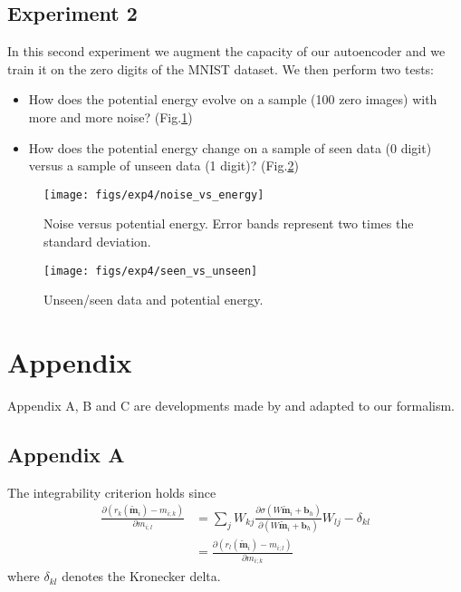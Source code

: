 \documentclass[12pt]{report}
\begin{document}
\clearpage
\subsection{Experiment 2}
In this second experiment we augment the capacity of our autoencoder and we train it on the zero digits of the MNIST dataset. We then perform two tests:
\begin{itemize}
\item How does the potential energy evolve on a sample (100 zero images) with more and more noise? (Fig.\ref{fig:noise-energy})
\item How does the potential energy change on a sample of seen data (0 digit) versus a sample of unseen data (1 digit)? (Fig.\ref{fig:seen-unseen})
\end{itemize}

\begin{figure}[!htbp]
  \centering
  \texttt{[image: figs/exp4/noise\_vs\_energy]}
  \caption{Noise versus potential energy. Error bands represent two times the standard deviation.}
  \label{fig:noise-energy}
\end{figure}

\begin{figure}[!htbp]
  \centering
  \texttt{[image: figs/exp4/seen\_vs\_unseen]}
  \caption{Unseen/seen data and potential energy.}
  \label{fig:seen-unseen}
\end{figure}

\clearpage
\newpage
\section{Appendix}\label{sec:appendix}
Appendix A, B and C are developments made by \cite{potentialenergy} and adapted to our formalism.

\subsection*{Appendix A}
The integrability criterion holds since
\begin{equation}
\begin{split}
\frac{\partial(r_k(\tilde{\textbf{m}}_i)- m_{i;k})}{\partial m_{i;l}} &= \sum_j W_{kj} \frac{\partial\sigma(W\tilde{\mathbf{m}}_i + \mathbf{b}_h)}{\partial(W\tilde{\mathbf{m}}_i + \mathbf{b}_h)}W_{lj} - \delta_{kl} \\
&= \frac{\partial(r_l(\tilde{\textbf{m}}_i)- m_{i;l})}{\partial m_{i;k}}
\end{split}
\end{equation} 
where $\delta_{kl}$ denotes the Kronecker delta.
\end{document}
